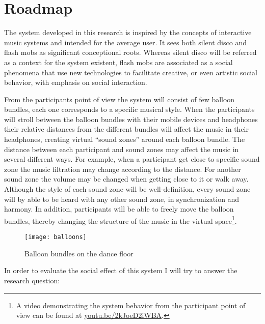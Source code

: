 \section{Roadmap}\label{roadmap}


The system developed in this research is inspired by the concepts of interactive music systems and intended for the average user.
It sees both silent disco and flash mobs as significant conceptional roots.
Whereas silent disco will be referred as a context for the system existent, flash mobs are associated as a social phenomena that use new technologies to facilitate creative, or even artistic social behavior, with emphasis on social interaction.

From the participants point of view the system will consist of few balloon bundles, each one corresponds to a specific musical style.
When the participants will stroll between the balloon bundles with their mobile devices and headphones their relative distances from the different bundles will affect the music in their headphones, creating virtual ``sound zones'' around each balloon bundle.
The distance between each participant and sound zones may affect the music in several different ways.
For example, when a participant get close to specific sound zone the music filtration may change according to the distance.
For another sound zone the volume may be changed when getting close to it or walk away.
Although the style of each sound zone will be well-definition, every sound zone will by able to be heard with any other sound zone, in synchronization and harmony.
In addition, participants will be able to freely move the balloon bundles, thereby changing the structure of the music in the virtual space\footnote{A video demonstrating the system behavior from the participant point of view can be found at \href{http://youtu.be/2kJoeD2iWBA}{youtu.be/2kJoeD2iWBA}.}.

\begin{figure}[h]
	\texttt{[image: balloons]}
	\caption{Balloon bundles on the dance floor}
\end{figure}

In order to evaluate the social effect of this system I will try to answer the research question: \emph{\reserchquestion}